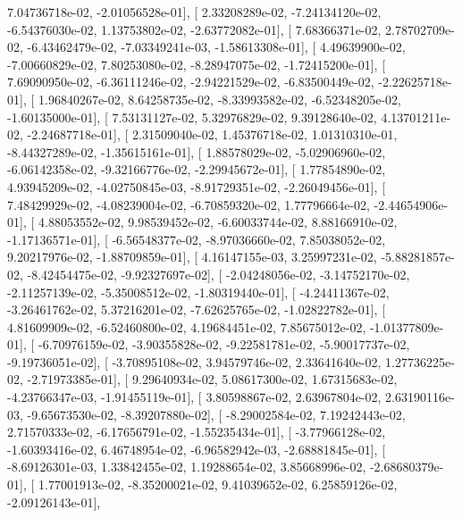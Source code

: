\documentclass{article}
\begin{document}
          7.04736718e-02,  -2.01056528e-01],
       [  2.33208289e-02,  -7.24134120e-02,  -6.54376030e-02,
          1.13753802e-02,  -2.63772082e-01],
       [  7.68366371e-02,   2.78702709e-02,  -6.43462479e-02,
         -7.03349241e-03,  -1.58613308e-01],
       [  4.49639900e-02,  -7.00660829e-02,   7.80253080e-02,
         -8.28947075e-02,  -1.72415200e-01],
       [  7.69090950e-02,  -6.36111246e-02,  -2.94221529e-02,
         -6.83500449e-02,  -2.22625718e-01],
       [  1.96840267e-02,   8.64258735e-02,  -8.33993582e-02,
         -6.52348205e-02,  -1.60135000e-01],
       [  7.53131127e-02,   5.32976829e-02,   9.39128640e-02,
          4.13701211e-02,  -2.24687718e-01],
       [  2.31509040e-02,   1.45376718e-02,   1.01310310e-01,
         -8.44327289e-02,  -1.35615161e-01],
       [  1.88578029e-02,  -5.02906960e-02,  -6.06142358e-02,
         -9.32166776e-02,  -2.29945672e-01],
       [  1.77854890e-02,   4.93945209e-02,  -4.02750845e-03,
         -8.91729351e-02,  -2.26049456e-01],
       [  7.48429929e-02,  -4.08239004e-02,  -6.70859320e-02,
          1.77796664e-02,  -2.44654906e-01],
       [  4.88053552e-02,   9.98539452e-02,  -6.60033744e-02,
          8.88166910e-02,  -1.17136571e-01],
       [ -6.56548377e-02,  -8.97036660e-02,   7.85038052e-02,
          9.20217976e-02,  -1.88709859e-01],
       [  4.16147155e-03,   3.25997231e-02,  -5.88281857e-02,
         -8.42454475e-02,  -9.92327697e-02],
       [ -2.04248056e-02,  -3.14752170e-02,  -2.11257139e-02,
         -5.35008512e-02,  -1.80319440e-01],
       [ -4.24411367e-02,  -3.26461762e-02,   5.37216201e-02,
         -7.62625765e-02,  -1.02822782e-01],
       [  4.81609909e-02,  -6.52460800e-02,   4.19684451e-02,
          7.85675012e-02,  -1.01377809e-01],
       [ -6.70976159e-02,  -3.90355828e-02,  -9.22581781e-02,
         -5.90017737e-02,  -9.19736051e-02],
       [ -3.70895108e-02,   3.94579746e-02,   2.33641640e-02,
          1.27736225e-02,  -2.71973385e-01],
       [  9.29640934e-02,   5.08617300e-02,   1.67315683e-02,
         -4.23766347e-03,  -1.91455119e-01],
       [  3.80598867e-02,   2.63967804e-02,   2.63190116e-03,
         -9.65673530e-02,  -8.39207880e-02],
       [ -8.29002584e-02,   7.19242443e-02,   2.71570333e-02,
         -6.17656791e-02,  -1.55235434e-01],
       [ -3.77966128e-02,  -1.60393416e-02,   6.46748954e-02,
         -6.96582942e-03,  -2.68881845e-01],
       [ -8.69126301e-03,   1.33842455e-02,   1.19288654e-02,
          3.85668996e-02,  -2.68680379e-01],
       [  1.77001913e-02,  -8.35200021e-02,   9.41039652e-02,
          6.25859126e-02,  -2.09126143e-01],
\end{document}

